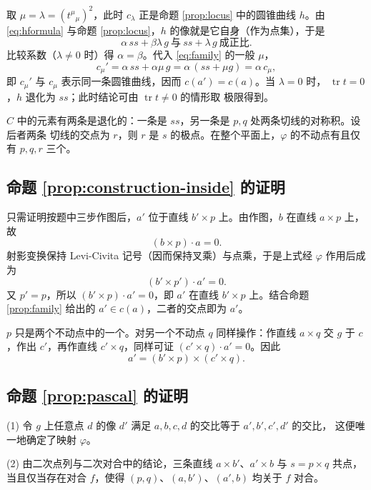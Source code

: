 取 $\mu=\lambda=({t^\mu}_\mu)^2$，此时 $c_\lambda$ 正是命题 \ref{prop:locus} 中的圆锥曲线
$h$。由 \eqref{eq:hformula} 与命题 \ref{prop:locus}，$h$ 的像就是它自身（作为点集），于是
\[
\alpha\,ss+\beta\lambda\,g
\ \text{与}\ ss+\lambda\,g\ \text{成正比}.
\]
比较系数（$\lambda\neq0$ 时）得 $\alpha=\beta$。代入 \eqref{eq:family} 的一般 $\mu$，
\[
c_\mu'=\alpha\,ss+\alpha\mu\,g=\alpha\,(ss+\mu g)=\alpha\,c_\mu,
\]
即 $c_\mu'$ 与 $c_\mu$ 表示同一条圆锥曲线，因而 $c(a')=c(a)$。当 $\lambda=0$ 时，
$\operatorname{tr}t=0$，$h$ 退化为 $ss$；此时结论可由 $\operatorname{tr}t\neq0$ 的情形取
极限得到。

\begin{remark}
$C$ 中的元素有两条是退化的：一条是 $ss$，另一条是 $p,q$ 处两条切线的对称积。设后者两条
切线的交点为 $r$，则 $r$ 是 $s$ 的极点。在整个平面上，$\varphi$ 的不动点有且仅有 $p,q,r$
三个。
\end{remark}

\subsection{命题 \ref{prop:construction-inside} 的证明}

只需证明按题中三步作图后，$a'$ 位于直线 $b'\times p$ 上。由作图，$b$ 在直线 $a\times p$ 上，
故
\[
(b\times p)\cdot a=0 .
\]
射影变换保持 Levi-Civita 记号（因而保持叉乘）与点乘，于是上式经 $\varphi$ 作用后成为
\[
(b'\times p')\cdot a'=0 .
\]
又 $p'=p$，所以 $(b'\times p)\cdot a'=0$，即 $a'$ 在直线 $b'\times p$ 上。结合命题
\ref{prop:family} 给出的 $a'\in c(a)$，二者的交点即为 $a'$。

\begin{remark}
$p$ 只是两个不动点中的一个。对另一个不动点 $q$ 同样操作：作直线 $a\times q$ 交 $g$ 于
$c$，作出 $c'$，再作直线 $c'\times q$，同样可证 $(c'\times q)\cdot a'=0$。因此
\[
a'=(b'\times p)\times(c'\times q).
\]
\end{remark}

\subsection{命题 \ref{prop:pascal} 的证明}

(1) 令 $g$ 上任意点 $d$ 的像 $d'$ 满足 $a,b,c,d$ 的交比等于 $a',b',c',d'$ 的交比，
这便唯一地确定了映射 $\varphi$。

(2) 由二次点列与二次对合中的结论，三条直线 $a\times b'$、$a'\times b$ 与 $s=p\times q$
共点，当且仅当存在对合 $f$，使得 $(p,q)$、$(a,b')$、$(a',b)$ 均关于 $f$ 对合。

